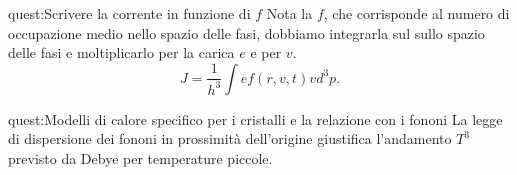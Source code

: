 \begin{quest}{quest:Scrivere la corrente in funzione di $f$}
Nota la $f$, che corrisponde al numero di occupazione medio nello spazio delle fasi, dobbiamo integrarla sul sullo spazio delle fasi e moltiplicarlo per la carica $e$ e per $v$.
\[
    J = \frac{1}{h^3}\int e f(r,v,t)v d^3p 
.\] 
\end{quest}
\begin{quest}{quest:Modelli di calore specifico per i cristalli e la relazione con i fononi}
La legge di dispersione dei fononi in prossimità dell'origine giustifica l'andamento $T^3$ previsto da Debye per temperature piccole.
\end{quest}

